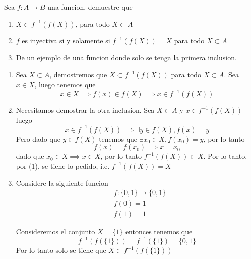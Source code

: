 \documentclass[../main.tex]{subfiles}
\begin{document}
\begin{problem}
  Sea $f: A \to B$ una funcion, demuestre que
  \begin{enumerate}
    \item $X \subset f^{-1}(f(X))$, para todo $X \subset A$
    \item $f$ es inyectiva si y solamente si $f^{-1}(f(X)) = X$ para todo $X \subset A$
    \item De un ejemplo de una funcion donde solo se tenga la primera inclusion.
  \end{enumerate}
\end{problem}
\begin{solution}
  \begin{enumerate}
  \item Sea $X \subset A$, demostremos que $X \subset f^{-1}(f(X))$ para todo $X \subset A$. Sea $x \in X$, luego tenemos que
    \begin{equation*}
      x \in X \implies f(x) \in f(X) \implies x \in f^{-1}(f(X))
    \end{equation*}

    \item Necesitamos demostrar la otra inclusion. Sea $X \subset A$ y $x \in f^{-1}(f(X))$ luego
          \begin{equation*}
            x \in f^{-1}(f(X)) \implies \exists y \in f(X), f(x) = y
          \end{equation*}
          Pero dado que $y \in f(X)$ tenemos que $\exists x_{0} \in X, f(x_{0}) = y$, por lo tanto
          \begin{equation*}
            f(x) = f(x_{0}) \implies x = x_{0}
          \end{equation*}
          dado que $x_{0} \in X \implies x \in X$, por lo tanto $f^{-1}(f(X)) \subset X$.
          Por lo tanto, por (1), se tiene lo pedido, i.e. $f^{-1}(f(X)) = X$

    \item Considere la siguiente funcion
          \begin{align*}
            &f : \{0, 1\} \to \{0, 1\}\\
            &f(0) = 1\\
            &f(1) = 1
          \end{align*}

          Consideremos el conjunto $X = \{1\}$ entonces tenemos que
          \begin{equation*}
            f^{-1}(f(\{1\})) = f^{-1}(\{1\}) = \{0, 1\}
          \end{equation*}
          Por lo tanto solo se tiene que $X \subset f^{-1}(f(\{1\}))$
  \end{enumerate}
\end{solution}
\end{document}
